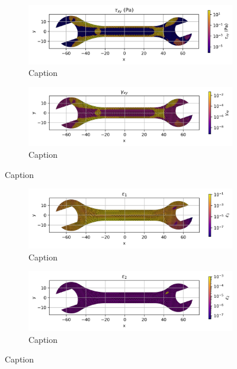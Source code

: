   \begin{figure}[H]
    \centering
    \begin{subfigure}[t]{0.49\textwidth}
      \centering
      \includegraphics[width=\textwidth]{GRAFICOS/Case a - tau_xy_per_element.png}
      \caption{Caption}
      \label{fig:deformada_reacciones}
    \end{subfigure}
    \hfill
    \begin{subfigure}[t]{0.49\textwidth}
      \centering
      \includegraphics[width=\textwidth]{GRAFICOS/Case a - gamma_xy_per_element.png}
      \caption{Caption}
      \label{fig:von_mises}
    \end{subfigure}
    \caption{Caption}
    \label{fig:analisis_estructural}
  \end{figure}

  \begin{figure}[H]
    \centering
    \begin{subfigure}[t]{0.49\textwidth}
      \centering
      \includegraphics[width=\textwidth]{GRAFICOS/Case a - epsilon_1_per_element.png}
      \caption{Caption}
      \label{fig:deformada_reacciones}
    \end{subfigure}
    \hfill
    \begin{subfigure}[t]{0.49\textwidth}
      \centering
      \includegraphics[width=\textwidth]{GRAFICOS/Case a - epsilon_2_per_element.png}
      \caption{Caption}
      \label{fig:von_mises}
    \end{subfigure}
    \caption{Caption}
    \label{fig:analisis_estructural}
  \end{figure}
  
